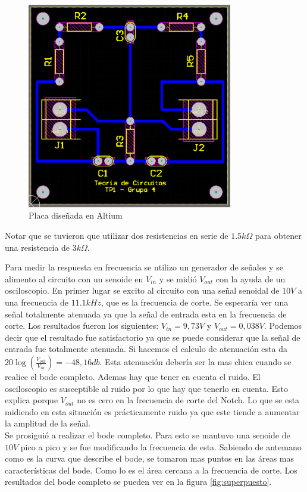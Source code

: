 \documentclass[12pt,a4paper]{article}
\begin{document}
\begin{figure}[Ht]                                                       
    \centering\includegraphics[width=0.8\textwidth]{placa_altium.png}
    \caption{Placa diseñada en Altium}
    \label{fig:placa_altium}
    \end{figure}

Notar que se tuvieron que utilizar dos resistencias en serie de $1.5k\Omega$ para obtener una
resistencia de $3k\Omega$. 

Para medir la respuesta en frecuencia se utilizo un generador de señales y se alimento al circuito con un senoide en $V_{in}$ y se midió $V_{out}$
con la ayuda de un osciloscopio. En primer lugar se excito al circuito con una señal 
senoidal de $10V$ a una frecuencia de $11.1kHz$, que es la frecuencia de corte. Se esperaría ver una señal totalmente atenuada ya que la señal de entrada esta en la frecuencia de corte. 
Los resultados fueron los siguientes: $V_{in}=9,73V$ y $V_{out}= 0,038V$. Podemos decir 
que el resultado fue satisfactorio ya que se puede considerar que la señal de entrada fue totalmente atenuada.
Si hacemos el calculo de atenuación esta da $20\log(\frac{V_{out}}{V_{in}}) = -48,16db$. Esta atenuación debería ser
la mas chica cuando se realice el bode completo. Ademas hay que tener en cuenta el ruido. El 
osciloscopio es susceptible al ruido por lo que hay que tenerlo en cuenta. Esto explica porque $V_{out}$
no es cero en la frecuencia de corte del Notch. Lo que se esta midiendo en esta situación es prácticamente ruido ya que 
este tiende a aumentar la amplitud de la señal. \\
Se prosiguió a realizar el bode completo. Para esto se mantuvo una senoide de $10V$ pico a pico
y se fue modificando la frecuencia de esta. Sabiendo de antemano como es la curva que 
describe el bode, se tomaron mas puntos en las áreas mas características del bode. Como lo es el área cercana a la frecuencia de corte. Los resultados del bode completo se pueden ver en la figura \ref{fig:superpuesto}.
\end{document}
